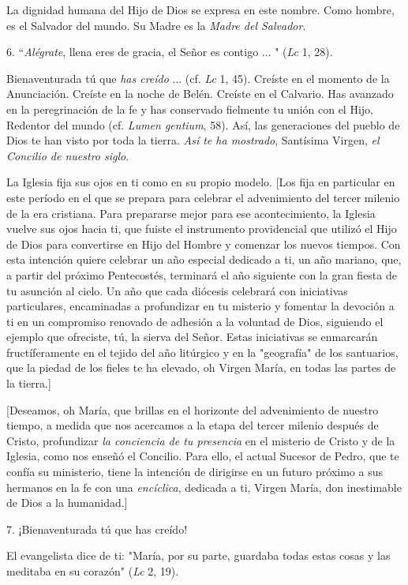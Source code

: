 \begin{body}
La dignidad humana del Hijo de Dios se expresa en este nombre. Como hombre, es el Salvador del mundo. Su Madre es la \emph{Madre del 	Salvador}.

6. ``\emph{Alégrate}, llena eres de gracia, el Señor es contigo ... " (\emph{Lc} 1, 28).

Bienaventurada tú que \emph{has creído} ... (cf. \emph{Lc} 1, 45). Creíste en el momento de la Anunciación. Creíste en la noche de Belén. Creíste en el Calvario. Has avanzado en la peregrinación de la fe y has conservado fielmente tu unión con el Hijo, Redentor del mundo (cf. \emph{Lumen gentium}, 58). Así, las generaciones del pueblo de Dios te han visto por toda la tierra. \emph{Así te ha mostrado}, Santísima Virgen, \emph{el Concilio de nuestro siglo}.

La Iglesia fija sus ojos en ti como en su propio modelo. {[}Los fija en particular en este período en el que se prepara para celebrar el advenimiento del tercer milenio de la era cristiana. Para prepararse mejor para ese acontecimiento, la Iglesia vuelve sus ojos hacia ti, que fuiste el instrumento providencial que utilizó el Hijo de Dios para convertirse en Hijo del Hombre y comenzar los nuevos tiempos. Con esta intención quiere celebrar un año especial dedicado a ti, un año mariano, que, a partir del próximo Pentecostés, terminará el año siguiente con la gran fiesta de tu asunción al cielo. Un año que cada diócesis celebrará con iniciativas particulares, encaminadas a profundizar en tu misterio y fomentar la devoción a ti en un compromiso renovado de adhesión a la voluntad de Dios, siguiendo el ejemplo que ofreciste, tú, la sierva del Señor. Estas iniciativas se enmarcarán fructíferamente en el tejido del año litúrgico y en la "geografía" de los santuarios, que la piedad de los fieles te ha elevado, oh Virgen María, en todas las partes de la tierra.{]}

{[}Deseamos, oh María, que brillas en el horizonte del advenimiento de nuestro tiempo, a medida que nos acercamos a la etapa del tercer milenio después de Cristo, profundizar \emph{la conciencia de tu presencia} en el misterio de Cristo y de la Iglesia, como nos enseñó el Concilio. Para ello, el actual Sucesor de Pedro, que te confía su ministerio, tiene la intención de dirigirse en un futuro próximo a sus hermanos en la fe con una \emph{encíclica}, dedicada a ti, Virgen María, don inestimable de Dios a la humanidad.{]}

7. ¡Bienaventurada tú que has creído!

El evangelista dice de ti: "María, por su parte, guardaba todas estas cosas y las meditaba en su corazón" (\emph{Lc} 2, 19).


\end{body}
